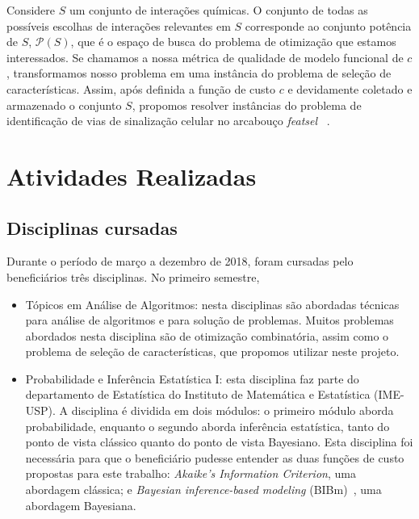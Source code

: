\documentclass[12pt]{article}
\newcommand{\powerset}{\mathcal{P}}
\begin{document}
Considere $S$ um conjunto de interações químicas. O conjunto de todas
as possíveis escolhas de interações relevantes em $S$ corresponde ao
conjunto potência de $S$, $\powerset(S)$, que é o espaço de busca do
problema de otimização que estamos interessados. Se chamamos a nossa 
métrica de qualidade de modelo funcional de $c$, transformamos nosso 
problema em uma instância do problema de seleção de características. 
Assim, após definida a função de custo $c$ e devidamente coletado e 
armazenado o conjunto $S$, propomos resolver instâncias do problema de 
identificação de vias de sinalização celular no arcabouço 
{\em featsel} ~\cite{Reis2017featsel}. 


\section{Atividades Realizadas}

\subsection{Disciplinas cursadas}

Durante o período de março a dezembro de 2018, foram cursadas pelo
beneficiários três disciplinas. No primeiro semestre, 
\begin{itemize}
    \item{Tópicos em Análise de Algoritmos:} nesta disciplinas são
        abordadas técnicas para análise de algoritmos e para solução
        de problemas. Muitos problemas abordados nesta disciplina são
        de otimização combinatória, assim como o problema de seleção de 
        características, que propomos utilizar neste projeto.
    \item{Probabilidade e Inferência Estatística I:} esta disciplina
        faz parte do departamento de Estatística do Instituto de 
        Matemática e Estatística (IME-USP). A disciplina é dividida em
        dois módulos: o primeiro módulo aborda probabilidade, enquanto
        o segundo aborda inferência estatística, tanto do ponto de vista
        clássico quanto do ponto de vista Bayesiano. Esta disciplina
        foi necessária para que o beneficiário pudesse entender as 
        duas funções de custo propostas para este trabalho: {\em 
        Akaike's Information Criterion}, uma abordagem clássica; e 
        {\em Bayesian inference-based modeling} (BIBm)~\cite{Xu2010}, 
        uma abordagem Bayesiana.
\end{itemize}
\end{document}
